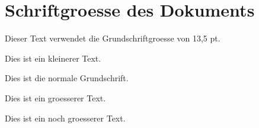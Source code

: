 \documentclass[a4paper]{article}
\begin{document}
\section{Schriftgroesse des Dokuments}

Dieser Text verwendet die Grundschriftgroesse
von 13,5 pt.

\bigskip

{\small
Dies ist ein kleinerer Text.\par}

\bigskip

{\normalsize
Dies ist die normale Grundschrift.\par}

\bigskip

{\large
Dies ist ein groesserer Text.\par}

\bigskip

{\Large
Dies ist ein noch groesserer Text.\par}
\end{document}
